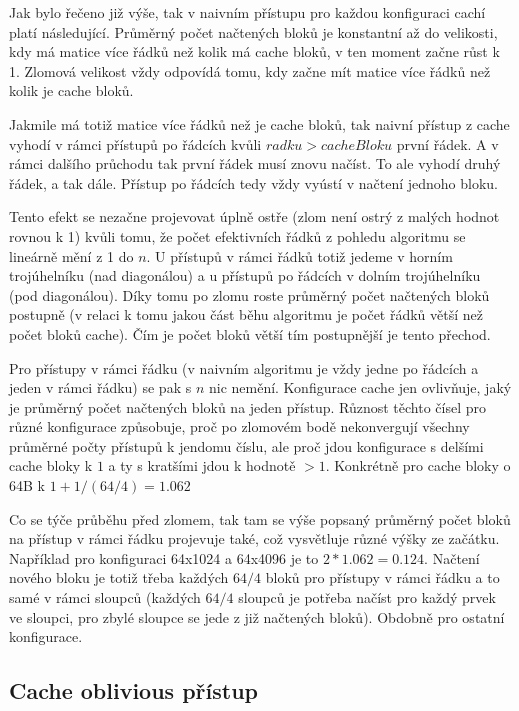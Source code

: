 \documentclass[12pt,a4paper]{report}
\begin{document}
	Jak bylo řečeno již výše, tak v naivním přístupu pro každou konfiguraci cachí platí následující. Průměrný počet načtených bloků je konstantní až do velikosti, kdy má matice více řádků než kolik má cache bloků, v ten moment začne růst k 1. Zlomová velikost vždy odpovídá tomu, kdy začne mít matice více řádků než kolik je cache bloků. 
	
	Jakmile má totiž matice více řádků než je cache bloků, tak naivní přístup z cache vyhodí v rámci přístupů po řádcích kvůli $radku > cacheBloku$ první řádek. A v rámci dalšího průchodu tak první řádek musí znovu načíst. To ale vyhodí druhý řádek, a tak dále. Přístup po řádcích tedy vždy vyústí v načtení jednoho bloku.
	
	Tento efekt se nezačne projevovat úplně ostře (zlom není ostrý z malých hodnot rovnou k 1) kvůli tomu, že počet efektivních řádků z pohledu algoritmu se lineárně mění z 1 do $n$. U přístupů v rámci řádků totiž jedeme v horním trojúhelníku (nad diagonálou) a u přístupů po řádcích v dolním trojúhelníku (pod diagonálou). Díky tomu po zlomu roste průměrný počet načtených bloků postupně (v relaci k tomu jakou část běhu algoritmu je počet řádků větší než počet bloků cache). Čím je počet bloků větší tím postupnější je tento přechod.

	Pro přístupy v rámci řádku (v naivním algoritmu je vždy jedne po řádcích a jeden v rámci řádku) se pak s $n$ nic nemění. Konfigurace cache jen ovlivňuje, jaký je průměrný počet načtených bloků na jeden přístup. Různost těchto čísel pro různé konfigurace způsobuje, proč po zlomovém bodě nekonvergují všechny průměrné počty přístupů k jendomu číslu, ale proč jdou konfigurace s delšími cache bloky k $1$ a ty s kratšími jdou k hodnotě $> 1$. Konkrétně pro cache bloky o 64B k $1 + 1/(64 / 4) = 1.062$
		
	Co se týče průběhu před zlomem, tak tam se výše popsaný průměrný počet bloků na přístup v rámci řádku projevuje také, což vysvětluje různé výšky ze začátku. Například pro konfiguraci 64x1024 a 64x4096 je to $2 * 1.062 = 0.124$. Načtení nového bloku je totiž třeba každých $64 / 4$ bloků pro přístupy v rámci řádku a to samé v rámci sloupců (každých $64 / 4$ sloupců je potřeba načíst pro každý prvek ve sloupci, pro zbylé sloupce se jede z již načtených bloků). Obdobně pro ostatní konfigurace.


	\subsection{Cache oblivious přístup}
	
\end{document}
